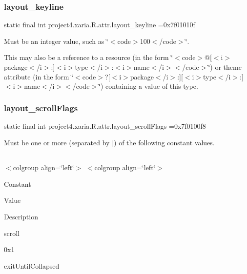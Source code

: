 \subsubsection{\texorpdfstring{layout\+\_\+keyline}{layout\_keyline}}
{\footnotesize\ttfamily static final int project4.\+xaria.\+R.\+attr.\+layout\+\_\+keyline =0x7f01010f\hspace{0.3cm}{\ttfamily [static]}}

Must be an integer value, such as \char`\"{}$<$code$>$100$<$/code$>$\char`\"{}. 

This may also be a reference to a resource (in the form \char`\"{}$<$code$>$@\mbox{[}$<$i$>$package$<$/i$>$\+:\mbox{]}$<$i$>$type$<$/i$>$\+:$<$i$>$name$<$/i$>$$<$/code$>$\char`\"{}) or theme attribute (in the form \char`\"{}$<$code$>$?\mbox{[}$<$i$>$package$<$/i$>$\+:\mbox{]}\mbox{[}$<$i$>$type$<$/i$>$\+:\mbox{]}$<$i$>$name$<$/i$>$$<$/code$>$\char`\"{}) containing a value of this type. \mbox{\label{classproject4_1_1xaria_1_1R_1_1attr_a60eceb84cb6e25f5b094a8d58d247d93}} 
\subsubsection{\texorpdfstring{layout\+\_\+scroll\+Flags}{layout\_scrollFlags}}
{\footnotesize\ttfamily static final int project4.\+xaria.\+R.\+attr.\+layout\+\_\+scroll\+Flags =0x7f0100f8\hspace{0.3cm}{\ttfamily [static]}}

Must be one or more (separated by \textquotesingle{}$\vert$\textquotesingle{}) of the following constant values.

\tabulinesep=1mm
\begin{longtabu} spread 0pt [c]{*{0}{|X[-1]}|}
\hline
\end{longtabu}
$<$colgroup align=\char`\"{}left\char`\"{}$>$ $<$colgroup align=\char`\"{}left\char`\"{}$>$ 

Constant

Value

Description 

{\ttfamily scroll}

0x1

{\ttfamily exit\+Until\+Collapsed}

